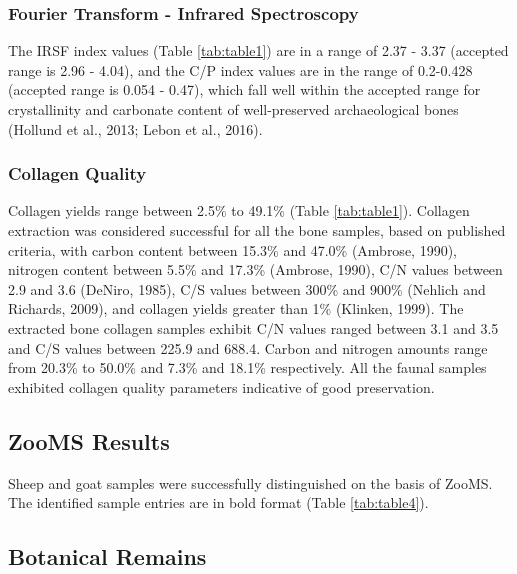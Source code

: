 \documentclass[review]{elsarticle} %
\begin{document}
\hypertarget{fourier-transform---infrared-spectroscopy}{%
\subsubsection{Fourier Transform - Infrared Spectroscopy}\label{fourier-transform---infrared-spectroscopy}}

The IRSF index values (Table \ref{tab:table1}) are in a range of 2.37 - 3.37 (accepted range is 2.96 - 4.04), and the C/P index values are in the range of 0.2-0.428 (accepted range is 0.054 - 0.47), which fall well within the accepted range for crystallinity and carbonate content of well-preserved archaeological bones (Hollund et al., 2013; Lebon et al., 2016).

\hypertarget{collagen-quality}{%
\subsubsection{Collagen Quality}\label{collagen-quality}}

Collagen yields range between 2.5\% to 49.1\% (Table \ref{tab:table1}). Collagen extraction was considered successful for all the bone samples, based on published criteria, with carbon content between 15.3\% and 47.0\% (Ambrose, 1990), nitrogen content between 5.5\% and 17.3\% (Ambrose, 1990), C/N values between 2.9 and 3.6 (DeNiro, 1985), C/S values between 300\% and 900\% (Nehlich and Richards, 2009), and collagen yields greater than 1\% (Klinken, 1999). The extracted bone collagen samples exhibit C/N values ranged between 3.1 and 3.5 and C/S values between 225.9 and 688.4. Carbon and nitrogen amounts range from 20.3\% to 50.0\% and 7.3\% and 18.1\% respectively. All the faunal samples exhibited collagen quality parameters indicative of good preservation.

\hypertarget{zooms-results}{%
\subsection{ZooMS Results}\label{zooms-results}}

Sheep and goat samples were successfully distinguished on the basis of ZooMS. The identified sample entries are in bold format (Table \ref{tab:table4}).

\hypertarget{botanical-remains}{%
\subsection{Botanical Remains}\label{botanical-remains}}
\end{document}
